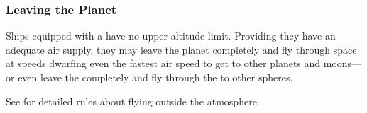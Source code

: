 \begin{multicols*}{2}
\subsubsection{Leaving the Planet}
Ships equipped with a  have no upper altitude limit. Providing they have an adequate air supply, they may leave the planet completely and fly through space at speeds dwarfing even the fastest air speed to get to other planets and moons—or even leave the  completely and fly through the  to other spheres.

See  for detailed rules about flying outside the atmosphere.

\end{multicols*}

